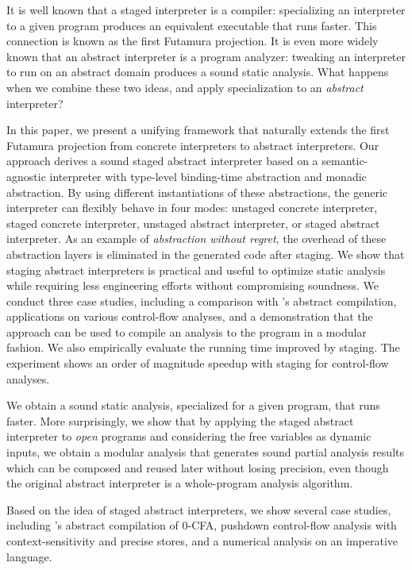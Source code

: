 It is well known that a staged interpreter is a compiler: specializing an
interpreter to a given program produces an equivalent executable that runs faster.
This connection is known as the first Futamura projection.
It is even more widely known that an abstract interpreter is a program analyzer:
tweaking an interpreter to run on an abstract domain produces a sound static
analysis. What happens when we combine these two ideas, and apply specialization to
an \emph{abstract} interpreter?

In this paper, we present a unifying framework that naturally extends the first
Futamura projection from concrete interpreters to abstract interpreters. Our
approach derives a sound staged abstract interpreter based on a
semantic-agnostic interpreter with type-level binding-time abstraction and
monadic abstraction. By using different instantiations of these abstractions,
the generic interpreter can flexibly behave in four modes: unstaged concrete
interpreter, staged concrete interpreter, unstaged abstract interpreter, or
staged abstract interpreter.
As an example of \emph{abstraction without regret}, the overhead of these
abstraction layers is eliminated in the generated code after staging.
We show that staging abstract interpreters is practical and useful to
optimize static analysis while requiring less engineering efforts without 
compromising soundness. We conduct three case studies, including a comparison
with \citeauthor{Boucher:1996:ACN:647473.727587}'s abstract compilation,
applications on various control-flow analyses, and a demonstration that
the approach can be used to compile an analysis to the program in a modular
fashion.  We also empirically evaluate the running time improved by staging.
The experiment shows an order of magnitude speedup with staging for
control-flow analyses.

\iffalse
We obtain a sound static analysis, specialized for
a given program, that runs faster. More surprisingly, we show that by applying
the staged abstract interpreter to \textit{open} programs and considering the
free variables as dynamic inputs, we obtain a modular analysis that generates
sound partial analysis results which can be composed and reused later without
losing precision, even though the original abstract interpreter is a
whole-program analysis algorithm.

Based on the idea of staged abstract interpreters, we show several case studies,
including \citeauthor{Boucher:1996:ACN:647473.727587}'s abstract compilation of
0-CFA, pushdown control-flow analysis with context-sensitivity and precise
stores, and a numerical analysis on an imperative language.

